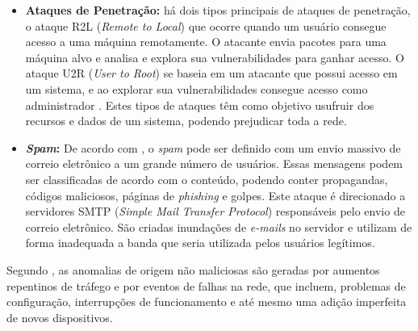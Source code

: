 \begin{itemize}
  \item \textbf{Ataques de Penetração:} há dois tipos principais de ataques de penetração, o ataque R2L (\textit{Remote to Local}) que ocorre quando um usuário consegue acesso a uma máquina remotamente. O atacante envia pacotes para uma máquina alvo e analisa e explora sua vulnerabilidades para ganhar acesso. O ataque U2R (\textit{User to Root}) se baseia em um atacante que possui acesso em um sistema, e ao explorar sua vulnerabilidades consegue acesso como administrador \cite{Silva2007}. Estes tipos de ataques têm como objetivo usufruir dos recursos e dados de um sistema, podendo prejudicar toda a rede.
  \item \textbf{\textit{Spam}:} De acordo com , o \textit{spam} pode ser definido com um envio massivo de correio eletrônico a um grande número de usuários. Essas mensagens podem ser classificadas de acordo com o conteúdo, podendo conter propagandas, códigos maliciosos, páginas de \textit{phishing} e golpes. Este ataque é direcionado a servidores SMTP (\textit{Simple Mail Transfer Protocol}) responsáveis pelo envio de correio eletrônico. São criadas inundações de \textit{e-mails} no servidor e utilizam de forma inadequada a banda que seria utilizada pelos usuários legítimos.
  \end{itemize}


\indent Segundo , as anomalias de origem não maliciosas são geradas por  aumentos repentinos de tráfego e por eventos de falhas na rede, que incluem, problemas de configuração, interrupções de funcionamento e até mesmo uma adição imperfeita de novos dispositivos.

